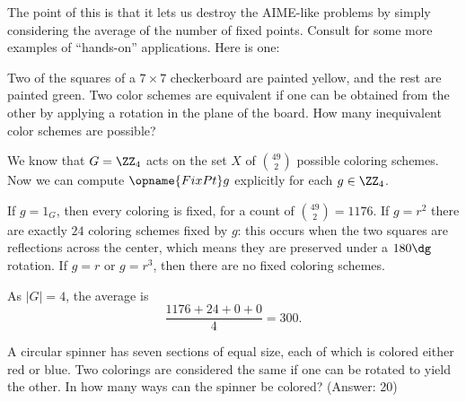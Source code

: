 The point of this is that it lets us destroy the AIME-like problems by simply considering the average of the number of fixed points.
Consult \cite{ref:aops_burnside} 
for some more examples of ``hands-on'' applications.
Here is one:
\begin{example}
	[AIME 1996]
	Two of the squares of a $7 \times 7$ checkerboard are painted yellow, and the rest are painted green. Two color schemes are equivalent if one can be obtained from the other by applying a rotation in the plane of the board. How many inequivalent color schemes are possible?

	We know that $G = \Zc4$ acts on the set $X$ of $\binom{49}{2}$ possible coloring schemes.
	Now we can compute $\opname{FixPt} g$ explicitly for each $g \in \Zc4$.
	\begin{itemize}
		\ii If $g = 1_G$, then every coloring is fixed, for a count of $\binom{49}{2} = 1176$.
		\ii If $g = r^2$ there are exactly $24$ coloring schemes fixed by $g$:
		this occurs when the two squares are reflections across the center,
		which means they are preserved under a $180\dg$ rotation.
		\ii If $g = r$ or $g=r^3$, then there are no fixed coloring schemes.
	\end{itemize}
	As $\left\lvert G \right\rvert = 4$, the average is
	\[ \frac{1176 + 24 + 0 + 0}{4} = 300. \]
\end{example}
\begin{exercise}
	A circular spinner has seven sections of equal size,
	each of which is colored either red or blue.
	Two colorings are considered the same if one can be rotated to yield the other.
	In how many ways can the spinner be colored? (Answer: 20)
\end{exercise}

